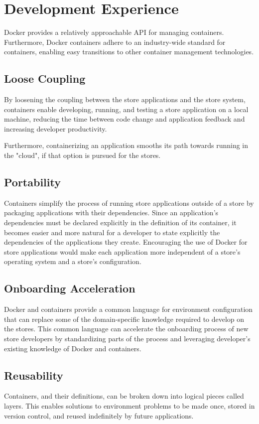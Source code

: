 \documentclass{article}
\begin{document}
\section{Development Experience}
Docker provides a relatively approachable API for managing containers. Furthermore, Docker containers adhere to an industry-wide standard for containers, enabling easy transitions to other container management technologies.

\subsection{Loose Coupling}
By loosening the coupling between the store applications and the store system, containers enable developing, running, and testing a store application on a local machine, reducing the time between code change and application feedback and increasing developer productivity.

Furthermore, containerizing an application smooths its path towards running in the "cloud", if that option is pursued for the stores.

\subsection{Portability}
Containers simplify the process of running store applications outside of a store by packaging applications with their dependencies. Since an application's dependencies must be declared explicitly in the definition of its container, it becomes easier and more natural for a developer to state explicitly the dependencies of the applications they create. Encouraging the use of Docker for store applications would make each application more independent of a store's operating system and a store's configuration.

\subsection{Onboarding Acceleration}
Docker and containers provide a common language for environment configuration that can replace some of the domain-specific knowledge required to develop on the stores. This common language can accelerate the onboarding process of new store developers by standardizing parts of the process and leveraging developer's existing knowledge of Docker and containers.

\subsection{Reusability}
Containers, and their definitions, can be broken down into logical pieces called layers. This enables solutions to environment problems to be made once, stored in version control, and reused indefinitely by future applications.
\end{document}
